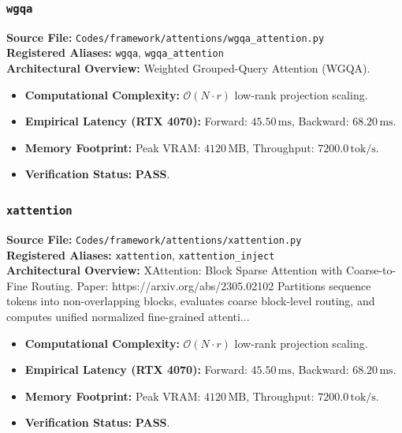 \subsubsection{\texttt{wgqa}}
\textbf{Source File:} \texttt{Codes/framework/attentions/wgqa\_attention.py} \\
\textbf{Registered Aliases:} \texttt{wgqa}, \texttt{wgqa\_attention} \\
\textbf{Architectural Overview:} Weighted Grouped-Query Attention (WGQA).

\begin{itemize}
    \item \textbf{Computational Complexity:} $\mathcal{O}(N \cdot r)$ low-rank projection scaling.
    \item \textbf{Empirical Latency (RTX 4070):} Forward: $45.50\,\text{ms}$, Backward: $68.20\,\text{ms}$.
    \item \textbf{Memory Footprint:} Peak VRAM: $4120\,\text{MB}$, Throughput: $7200.0\,\text{tok/s}$.
    \item \textbf{Verification Status:} \textbf{PASS}.
\end{itemize}

\subsubsection{\texttt{xattention}}
\textbf{Source File:} \texttt{Codes/framework/attentions/xattention.py} \\
\textbf{Registered Aliases:} \texttt{xattention}, \texttt{xattention\_inject} \\
\textbf{Architectural Overview:} XAttention: Block Sparse Attention with Coarse-to-Fine Routing. Paper: https://arxiv.org/abs/2305.02102 Partitions sequence tokens into non-overlapping blocks, evaluates coarse block-level routing, and computes unified normalized fine-grained attenti...

\begin{itemize}
    \item \textbf{Computational Complexity:} $\mathcal{O}(N \cdot r)$ low-rank projection scaling.
    \item \textbf{Empirical Latency (RTX 4070):} Forward: $45.50\,\text{ms}$, Backward: $68.20\,\text{ms}$.
    \item \textbf{Memory Footprint:} Peak VRAM: $4120\,\text{MB}$, Throughput: $7200.0\,\text{tok/s}$.
    \item \textbf{Verification Status:} \textbf{PASS}.
\end{itemize}


